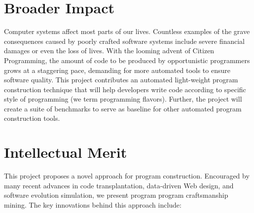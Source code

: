 \section*{Broader Impact} %
\label{sec:impact}

Computer systems affect most parts of our lives. Countless examples of the grave 
consequences caused by poorly crafted software systems include severe financial damages 
or even the loss of lives. With the looming advent of Citizen Programming, the amount 
of code to be produced by opportunistic programmers grows at a staggering pace, 
demanding for more automated tools to ensure software quality. This project contributes 
an automated light-weight program construction technique that will help developers write 
code according to specific style of programming (we term programming flavors). Further, 
the project will create a suite of benchmarks to serve as baseline for other automated 
program construction tools.


\section*{Intellectual Merit} %
\label{sec:merit}

This project proposes a novel approach for program construction. Encouraged by many 
recent advances in code transplantation, data-driven Web design, and software evolution 
simulation, we present program program craftsmanship mining.  The key innovations 
behind this approach include: